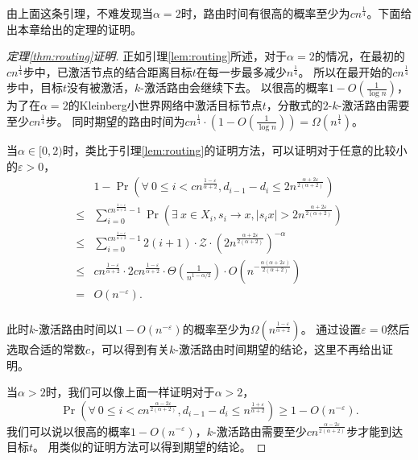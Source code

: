 由上面这条引理，不难发现当$\alpha = 2$时，路由时间有很高的概率至少为$cn^{\frac{1}{4}}$。下面给出本章给出的定理的证明。
\begin{proof}[定理\ref{thm:routing}证明]
正如引理\ref{lem:routing}所述，对于$\alpha = 2$的情况，在最初的$cn^{\frac{1}{4}}$步中，已激活节点的结合距离目标$t$在每一步最多减少$n^{\frac{1}{4}}$。
所以在最开始的$cn^{\frac{1}{4}}$步中，目标$t$没有被激活，$k$-激活路由会继续下去。
以很高的概率$1-O(\frac{1}{\log n})$，为了在$\alpha=2$的Kleinberg小世界网络中激活目标节点$t$，分散式的$2$-$k$-激活路由需要至少$cn^{\frac{1}{4}}$步。
同时期望的路由时间为$cn^{\frac{1}{4}} \cdot (1-O(\frac{1}{\log n})) = \Omega(n^{\frac{1}{4}})$。

当$\alpha\in [0,2)$时，类比于引理\ref{lem:routing}的证明方法，可以证明对于任意的比较小的$\varepsilon > 0$，
\begin{equation*}
\begin{array}{ll}
& 1- \Pr(\forall~0 \leq i < cn^{\frac{1-\varepsilon}{\alpha+2}},
d_{i-1}-d_{i}\leq 2n^{\frac{\alpha + 2\varepsilon}{2(\alpha+2)}})\\
\leq & \sum_{i=0}^{cn^{\frac{1-\varepsilon}{\alpha+2}}-1}\Pr(\exists~x \in X_i, s_i \to x,
|s_ix| > 2n^{\frac{\alpha + 2\varepsilon}{2(\alpha+2)}})\\
\leq & \sum_{i=0}^{cn^{\frac{1-\varepsilon}{\alpha+2}}-1} 2(i+1) \cdot \mathcal{Z} \cdot (2n^{\frac{\alpha + 2\varepsilon}{2(\alpha+2)}})^{-\alpha} \\
\leq & cn^{\frac{1-\varepsilon}{\alpha+2}}
\cdot 2cn^{\frac{1-\varepsilon}{\alpha+2}} \cdot \Theta(\frac{1}{n^{1-\alpha/2}})\cdot
O(n^{-\frac{\alpha(\alpha + 2\varepsilon)}{2(\alpha+2)}})\\
= & O(n^{-\varepsilon}).\\
\end{array}
\end{equation*}

此时$k$-激活路由时间以$1-O(n^{-\varepsilon})$的概率至少为$\Omega(n^{\frac{1-\varepsilon}{\alpha+2}})$。
通过设置$\varepsilon = 0$然后选取合适的常数$c$，可以得到有关$k$-激活路由时间期望的结论，这里不再给出证明。

当$ \alpha >2$时，我们可以像上面一样证明对于$ \alpha >2$，
$$\Pr(\forall~0 \leq i < cn^{\frac{\alpha-2\varepsilon}{2(\alpha+2)}},
d_{i-1}-d_{i}\leq n^{\frac{1 + \varepsilon}{\alpha+2}}) \geq 1-O(n^{-\varepsilon}).$$
我们可以说以很高的概率$1-O(n^{-\varepsilon})$，$k$-激活路由需要至少$cn^{\frac{\alpha-2\varepsilon}{2(\alpha+2)}}$步才能到达目标$t$。
用类似的证明方法可以得到期望的结论。


\end{proof}

